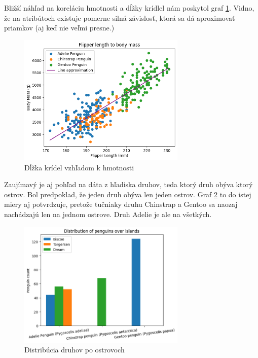 \documentclass[10pt,xcolor=pdflatex,dvipsnames,table,oneside]{book}
\begin{document}
Bližší náhľad na koreláciu hmotnosti a dĺžky krídlel nám poskytol graf \ref{fig:flbm}. Vidno, že na atribútoch existuje pomerne silná závislosť, ktorá sa dá aproximovať priamkov (aj keď nie veľmi presne.)
\begin{figure}[h]
  \centering
  \includegraphics[width=8cm]{img/flbm.png}
  \caption{Dĺžka krídel vzhľadom k hmotnosti}
  \label{fig:flbm}
\end{figure}
\FloatBarrier

Zaujímavý je aj pohľad na dáta z hľadiska druhov, teda ktorý druh obýva ktorý ostrov. Bol predpoklad, že jeden druh obýva len jeden ostrov. Graf \ref{fig:islanddist} to do istej miery aj potvrdzuje, pretože tučniaky druhu Chinstrap a Gentoo sa naozaj nachádzajú len na jednom ostrove. Druh Adelie je ale na všetkých.
\begin{figure}[h]
  \centering
  \includegraphics[width=8cm]{img/distribution_species.png}
  \caption{Distribúcia druhov po ostrovoch}
  \label{fig:islanddist}
\end{figure}
\end{document}
